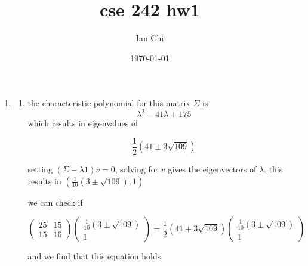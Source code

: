 \documentclass{article}
\title{cse 242 hw1}
\author{Ian Chi}
\date{\today}
\begin{document}
\maketitle

\section{}

\begin{enumerate}
    \item 
    \begin{enumerate}
        \item the characteristic polynomial for this matrix \(\Sigma\) is 
        \begin{equation}
            \lambda^2-41\lambda+175
        \end{equation}
        which results in eigenvalues of 
        
        \begin{equation}
            \frac{1}{2}(41\pm 3\sqrt{109})
        \end{equation}

        setting \(\left( \Sigma-\lambda 1 \right) v =0\), solving for \(v\) gives the eigenvectors of \(\lambda\). this results in \((\frac{1}{10}(3\pm\sqrt{109}),1)\)

        we can check if 

        \begin{equation}
            \begin{pmatrix}
                25 & 15\\
                15&16
            \end{pmatrix}
            \begin{pmatrix}
                \frac{1}{10}(3\pm\sqrt{109})\\
                1
            \end{pmatrix}
             = \frac{1}{2}(41+3\sqrt{109})\begin{pmatrix}
                \frac{1}{10}(3\pm\sqrt{109})\\
                1
            \end{pmatrix}
        \end{equation}

        and we find that this equation holds. 


\end{enumerate}
\end{enumerate}
\end{document}
